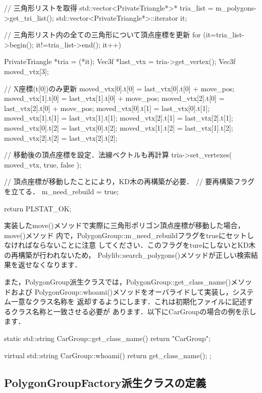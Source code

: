 {\begin{program}
{    // 三角形リストを取得
    std::vector<PrivateTriangle*>* tria_list = m_polygons->get_tri_list();
    std::vector<PrivateTriangle*>::iterator it;

    // 三角形リスト内の全ての三角形について頂点座標を更新
    for (it=tria_list->begin(); it!=tria_list->end(); it++) {
        PrivateTriangle *tria = (*it);
        Vec3f             *last_vtx = tria->get_vertex();
        Vec3f              moved_vtx[3];

        // X座標(t[0])のみ更新
        moved_vtx[0].t[0] = last_vtx[0].t[0] + move_pos;
        moved_vtx[1].t[0] = last_vtx[1].t[0] + move_pos;
        moved_vtx[2].t[0] = last_vtx[2].t[0] + move_pos;
        moved_vtx[0].t[1] = last_vtx[0].t[1];
        moved_vtx[1].t[1] = last_vtx[1].t[1];
        moved_vtx[2].t[1] = last_vtx[2].t[1];
        moved_vtx[0].t[2] = last_vtx[0].t[2];
        moved_vtx[1].t[2] = last_vtx[1].t[2];
        moved_vtx[2].t[2] = last_vtx[2].t[2];

        // 移動後の頂点座標を設定．法線ベクトルも再計算
        tria->set_vertexes( moved_vtx, true, false );
    }

    // 頂点座標が移動したことにより，KD木の再構築が必要．
    // 要再構築フラグを立てる．
    m_need_rebuild = true;

    return PLSTAT_OK;
}
\end{program}

実装したmove()メソッドで実際に三角形ポリゴン頂点座標が移動した場合，move()メソッド
内で，PolygonGroup::m\_need\_rebuildフラグをtrueにセットしなければならないことに注意
してください．このフラグをtureにしないとKD木の再構築が行われないため，
Polylib::search\_polygons()メソッドが正しい検索結果を返せなくなります．

また，PolygonGroup派生クラスでは，PolygonGroup::get\_class\_name()メソッドおよび
PolygonGroup::whoami()メソッドをオーバライドして実装し，システム一意なクラス名称を
返却するようにします．これは初期化ファイルに記述するクラス名称と一致させる必要が
あります．以下にCarGroupの場合の例を示します．

\begin{program}
static std::string CarGroup::get_class_name()
{
	return "CarGroup";
}

virtual std::string CarGroup::whoami()
{
	return get_class_name();
};
\end{program}

%
\subsection{PolygonGroupFactory派生クラスの定義}

}
